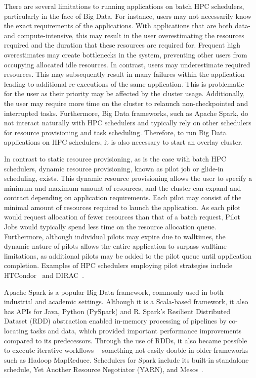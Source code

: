 \documentclass{IEEEtran}
\newcommand{\todo}[1]{\marginpar{\parbox{18mm}{\flushleft\tiny\color{red}\textbf{TODO}:
      #1}}}
\begin{document}
There are several limitations to running applications on batch HPC schedulers, 
particularly in the face of Big Data. For instance, users may not necessarily 
know the exact requirements of the applications. With applications that are 
both data- and compute-intensive, this may result in the user overestimating the
resources required and the duration that these resources are required for. Frequent
high overestimates may create bottlenecks in the system, preventing other users
from occupying allocated idle resources. In contrast, users may underestimate required 
resources. This may subsequently result in many failures within the application leading to
additional re-executions of the same application. This is problematic for the user
as their priority may be affected by the cluster usage. Additionally, the user may 
require more time on the cluster to relaunch non-checkpointed and interrupted 
tasks. Furthermore, Big Data frameworks, such as Apache Spark, do not interact naturally
with HPC schedulers and typically rely on other schedulers for resource provisioning
and task scheduling. Therefore, to run Big Data applications on HPC schedulers, 
it is also necessary to start an overlay cluster.



In contrast to static resource provisioning, as is the case with batch HPC schedulers, 
dynamic resource provisioning, known as pilot job or glide-in scheduling, exists. 
This dynamic resource provisioning allows the user to specify a minimum and maximum 
amount of resources, and the cluster can expand and contract depending on application requirements.
Each pilot may consist of the minimal amount of resources required to launch the 
application. As each pilot would request allocation of fewer resources than that of a batch
request, Pilot Jobs would typically spend less time on the resource allocation 
queue. Furthermore, although individual pilots may expire due to walltimes, the dynamic
nature of pilots allows the entire application to surpass walltime limitations, as
additional pilots may be added to the pilot queue until application completion. 
Examples of HPC schedulers employing pilot strategies include HTCondor~\cite{htcondor}
and DIRAC~\cite{DIRAC}. \todo{maybe mention PSOM and Pegasus here}

Apache Spark is a popular Big Data framework, commonly used in both industrial
and academic settings. Although it is a Scala-based framework, it also has APIs
for Java, Python (PySpark) and R. Spark's Resilient Distributed Dataset (RDD) abstraction enabled
in-memory processing of pipelines by co-locating tasks and data, which provided important performance improvements compared to its predecessors.
 Through the use of RDDs, it also became possible to execute iterative 
workflows -- something not easily doable in older frameworks such as Hadoop MapReduce.
Schedulers for Spark include its built-in standalone schedule, Yet Another Resource Negotiator (YARN),
and Mesos~\cite{yarn, mesos}.
\end{document}
